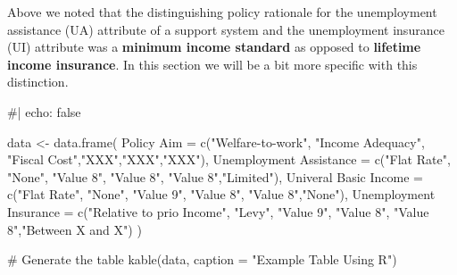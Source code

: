 \documentclass[
  letterpaper,
  DIV=11,
  numbers=noendperiod]{scrreprt}
\newenvironment{Shaded}{\begin{snugshade}}{\end{snugshade}}
\newcommand{\AttributeTok}[1]{\textcolor[rgb]{0.40,0.45,0.13}{#1}}
\newcommand{\CommentTok}[1]{\textcolor[rgb]{0.37,0.37,0.37}{#1}}
\newcommand{\FunctionTok}[1]{\textcolor[rgb]{0.28,0.35,0.67}{#1}}
\newcommand{\NormalTok}[1]{\textcolor[rgb]{0.00,0.23,0.31}{#1}}
\newcommand{\OtherTok}[1]{\textcolor[rgb]{0.00,0.23,0.31}{#1}}
\newcommand{\StringTok}[1]{\textcolor[rgb]{0.13,0.47,0.30}{#1}}
\begin{document}
Above we noted that the distinguishing policy rationale for the
unemployment assistance (UA) attribute of a support system and the
unemployment insurance (UI) attribute was a \textbf{minimum income
standard} as opposed to \textbf{lifetime income insurance}. In this
section we will be a bit more specific with this distinction.

\begin{Shaded}
\begin{Highlighting}[]
\CommentTok{\#| echo: false}

\NormalTok{data }\OtherTok{\textless{}{-}} \FunctionTok{data.frame}\NormalTok{(}
  \StringTok{\textasciigrave{}}\AttributeTok{Policy Aim}\StringTok{\textasciigrave{}} \OtherTok{=} \FunctionTok{c}\NormalTok{(}\StringTok{"Welfare{-}to{-}work"}\NormalTok{, }\StringTok{"Income Adequacy"}\NormalTok{, }\StringTok{"Fiscal Cost"}\NormalTok{,}\StringTok{"XXX"}\NormalTok{,}\StringTok{"XXX"}\NormalTok{,}\StringTok{"XXX"}\NormalTok{),}
  \StringTok{\textasciigrave{}}\AttributeTok{Unemployment Assistance}\StringTok{\textasciigrave{}} \OtherTok{=} \FunctionTok{c}\NormalTok{(}\StringTok{"Flat Rate"}\NormalTok{, }\StringTok{"None"}\NormalTok{, }\StringTok{"Value 8"}\NormalTok{, }\StringTok{"Value 8"}\NormalTok{, }\StringTok{"Value 8"}\NormalTok{,}\StringTok{"Limited"}\NormalTok{),}
  \StringTok{\textasciigrave{}}\AttributeTok{Univeral Basic Income}\StringTok{\textasciigrave{}} \OtherTok{=} \FunctionTok{c}\NormalTok{(}\StringTok{"Flat Rate"}\NormalTok{, }\StringTok{"None"}\NormalTok{, }\StringTok{"Value 9"}\NormalTok{, }\StringTok{"Value 8"}\NormalTok{, }\StringTok{"Value 8"}\NormalTok{,}\StringTok{"None"}\NormalTok{),}
  \StringTok{\textasciigrave{}}\AttributeTok{Unemployment Insurance}\StringTok{\textasciigrave{}} \OtherTok{=} \FunctionTok{c}\NormalTok{(}\StringTok{"Relative to prio Income"}\NormalTok{, }\StringTok{"Levy"}\NormalTok{, }\StringTok{"Value 9"}\NormalTok{, }\StringTok{"Value 8"}\NormalTok{, }\StringTok{"Value 8"}\NormalTok{,}\StringTok{"Between X and X"}\NormalTok{)}
\NormalTok{)}

\CommentTok{\# Generate the table}
\FunctionTok{kable}\NormalTok{(data, }\AttributeTok{caption =} \StringTok{"Example Table Using R"}\NormalTok{)}
\end{Highlighting}
\end{Shaded}
\end{document}
